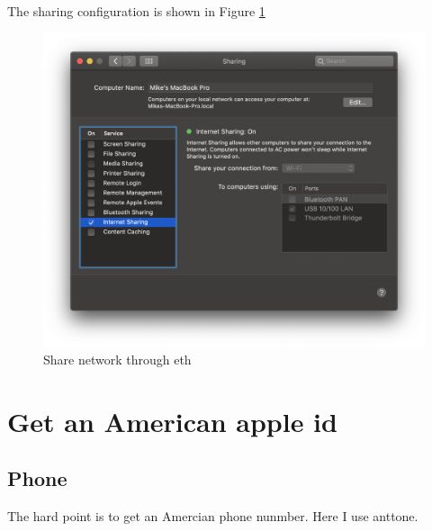 The sharing configuration is shown in Figure \ref{fig:share-through-eth}
\begin{figure}[!ht]
  \centering
  \includegraphics[width=\textwidth]{pics/share-through-eth}
  \caption{Share network through eth}
  \label{fig:share-through-eth}
\end{figure}



\section{Get an American apple id}

\subsection{Phone}

The hard point is to get an Amercian phone nunmber.
Here I use anttone.